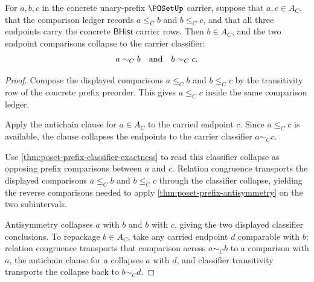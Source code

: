 \begin{theorem}
\label{thm:poset-antichain-interval-heredity}
For $a,b,c$ in the concrete unary-prefix $\POSetUp$ carrier, suppose that
$a,c\in A_C$, that the comparison ledger records $a\le_C b$ and $b\le_C c$, and
that all three endpoints carry the concrete $\mathsf{BHist}$ carrier rows. Then
$b\in A_C$, and the two endpoint comparisons collapse to the carrier classifier:
$$
a\sim_C b
\quad\hbox{and}\quad
b\sim_C c.
$$
\end{theorem}
\begin{proof}
Compose the displayed comparisons $a\le_C b$ and $b\le_C c$ by the transitivity
row of the concrete prefix preorder. This gives $a\le_C c$ inside the same
comparison ledger.

Apply the antichain clause for $a\in A_C$ to the carried endpoint $c$. Since
$a\le_C c$ is available, the clause collapses the endpoints to the carrier
classifier $a\sim_C c$.

Use \autoref{thm:poset-prefix-classifier-exactness} to read this classifier
collapse as opposing prefix comparisons between $a$ and $c$. Relation congruence
transports the displayed comparisons $a\le_C b$ and $b\le_C c$ through the
classifier collapse, yielding the reverse comparisons needed to apply
\autoref{thm:poset-prefix-antisymmetry} on the two subintervals.

Antisymmetry collapses $a$ with $b$ and $b$ with $c$, giving the two displayed
classifier conclusions. To repackage $b\in A_C$, take any carried endpoint $d$
comparable with $b$; relation congruence transports that comparison across
$a\sim_C b$ to a comparison with $a$, the antichain clause for $a$ collapses
$a$ with $d$, and classifier transitivity transports the collapse back to
$b\sim_C d$.
\end{proof}

